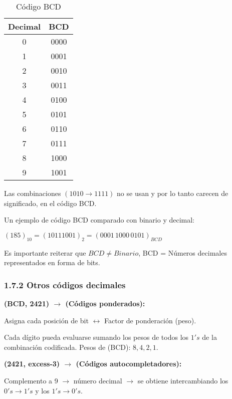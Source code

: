 \documentclass{article}
\begin{document}
\begin{table}[h]
    \centering
    \begin{tabular}{cc}
        \toprule
        Decimal & BCD \\
        \midrule
        0 & 0000 \\
        1 & 0001 \\
        2 & 0010 \\
        3 & 0011 \\
        4 & 0100 \\
        5 & 0101 \\
        6 & 0110 \\
        7 & 0111 \\
        8 & 1000 \\
        9 & 1001 \\
        \bottomrule
    \end{tabular}
    \caption{C\'{o}digo BCD}
    \label{tab:code_bcd}
\end{table}

Las combinaciones $(1010 \rightarrow 1111)$ no se usan y por lo tanto carecen de significado,
en el c\'{o}digo BCD.

Un ejemplo de c\'{o}digo BCD comparado con binario y decimal:
\begin{center}
    $(185)_{10} = (10111001)_{2} = (0001\,1000\,0101)_{BCD}$
\end{center}

Es importante reiterar que $BCD \neq Binario$, BCD = N\'{u}meros decimales representados
en forma de bits.

\subsubsection*{1.7.2 Otros c\'{o}digos decimales}

\textbf{(BCD, 2421) $\rightarrow$ (C\'{o}digos ponderados):}
\medbreak

Asigna cada posici\'{o}n de bit $\leftrightarrow$ Factor de ponderaci\'{on} (peso).

Cada d\'{i}gito pueda evaluarse sumando los pesos de todos los $1's$ de la combinaci\'{o}n
codificada. Pesos de (BCD): $8, 4, 2, 1$.
\medbreak

\textbf{(2421, excess-3) $\rightarrow$ (C\'{o}digos autocompletadores):}

Complemento a 9 $\rightarrow$ n\'{u}mero decimal $\rightarrow$ se obtiene intercambiando
los $0's \rightarrow 1's$ y los $1's \rightarrow 0's$.
\medbreak
\end{document}

